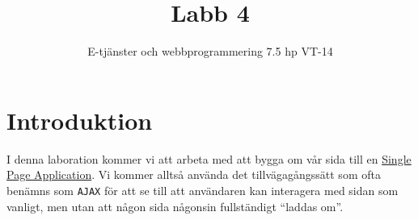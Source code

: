 \documentclass[12pt]{article}
\date{}
\title{ Labb 4 }
\author{ E-tjänster och webbprogrammering 7.5 hp VT-14 }
\begin{document}
\maketitle
\vspace{-2em}



\section{Introduktion}
I denna laboration kommer vi att arbeta med att bygga om vår sida till en \href{http://en.wikipedia.org/wiki/Single-page_application}{Single Page Application}. Vi kommer alltså använda det tillvägagångssätt som ofta benämns som \texttt{AJAX} för att se till att användaren kan interagera med sidan som vanligt, men utan att någon sida någonsin fullständigt ``laddas om''.





\pagebreak
\end{document}
